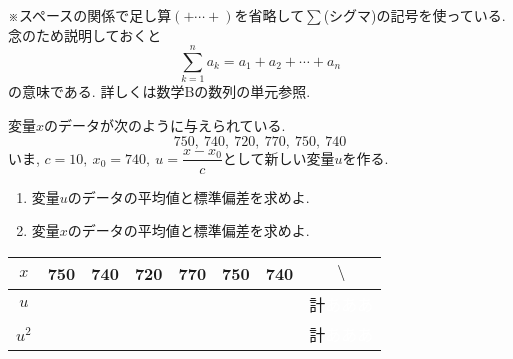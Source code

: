 \documentclass[a4paper,twocolumn,dvipdfmx]{jsarticle}
\theoremstyle{mydefinition}
\newtheorem[leftline=false,backgroundcolor=black!30!white]{thm}[dfn]{定理}
\newtheorem[leftline=false]{prac}{練習}
\begin{document}
	\noindent ※スペースの関係で足し算$(+\cdots+)$を省略して$\sum$(シグマ)の記号を使っている. 念のため説明しておくと \[\sum_{k=1}^na_k=a_1+a_2+\cdots+a_n\]の意味である. 詳しくは数学\textsf{B}の数列の単元参照.
	
	\newpage
	
	\begin{shadebox}
		\begin{prac}[教科書p.175]
			変量$x$のデータが次のように与えられている.\[750,\ 740,\ 720,\ 770,\ 750,\ 740\]いま, $c=10,\ x_0=740,\ u=\dfrac{x-x_0}{c}$として新しい変量$u$を作る.\footnotemark
			\begin{enumerate}
				\item 変量$u$のデータの平均値と標準偏差を求めよ.
				\item 変量$x$のデータの平均値と標準偏差を求めよ.
			\end{enumerate}
		\end{prac}
	\end{shadebox}
	
	
	\begin{center}
		\begin{tabular}{c||c|c|c|c|c|c|c}
		\hline
			$x$&750&740&720&770&750&740&$\setminus$\\\hline
			$u$&&&&&&&計\textcolor{white}{あああ}\\\hline
			$u^2$&&&&&&&計\textcolor{white}{あああ}\\\hline
		\end{tabular}

	\end{center}

	
	
	
	
	
	
	
	
	
	
	
	
	
\end{document}
